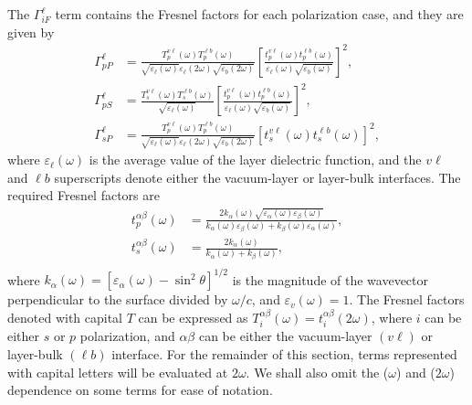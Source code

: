 \documentclass[prb,superscriptaddress,showpacs,twocolumn,letterpaper]{revtex4}
\begin{document}
The $\Gamma^{\ell}_{iF}$ term contains the Fresnel factors for each polarization
case, and they are given by
\begin{align*}
\Gamma^{\ell}_{pP} &=
\frac{T^{v\ell}_{p}(\omega)T^{\ell b}_{p}(\omega)}
     {\sqrt{\varepsilon_{\ell}(\omega)}\varepsilon_{\ell}({2\omega})
     \sqrt{\varepsilon_{b}(2\omega)}}
\left[\frac{t^{v\ell}_{p}(\omega)t^{\ell b}_{p}(\omega)}
{\varepsilon_{\ell}(\omega)\sqrt{\varepsilon_{b}(\omega)}}\right]^{2},\\
\Gamma^{\ell}_{pS} &=
\frac{T^{v\ell}_{s}(\omega)T^{\ell b}_{s}(\omega)}
     {\sqrt{\varepsilon_{\ell}(\omega)}}
\left[\frac{t^{v\ell}_{p}(\omega)t^{\ell b}_{p}(\omega)}
      {\varepsilon_{\ell}(\omega)\sqrt{\varepsilon_{b}(\omega)}}\right]^{2},\\
\Gamma^{\ell}_{sP} &=
\frac{T_{p}^{v\ell}(\omega)T^{\ell b}_{p}(\omega)}
    {\sqrt{\varepsilon_{\ell}(\omega)}\varepsilon_{\ell}(2\omega)
    \sqrt{\varepsilon_{b}(2\omega)}}
\left[t_s^{v\ell}(\omega)t^{\ell b}_s(\omega)\right]^2,
\end{align*}
where $\varepsilon_{\ell}(\omega)$ is the average value of the layer dielectric
function, and the $v\ell$ and $\ell b$ superscripts denote either the
vacuum-layer or layer-bulk interfaces. The required Fresnel factors
are\cite{mizrahiJOSA88}
\begin{align*}
t_{p}^{\alpha\beta}(\omega) &=
\frac{2k_{\alpha}(\omega)
\sqrt{\varepsilon_{\alpha}(\omega)\varepsilon_{\beta}(\omega)}}
{k_{\alpha}(\omega)\varepsilon_{\beta}(\omega)+
k_{\beta}(\omega)\varepsilon_{\alpha}(\omega)},\\
t_s^{\alpha\beta}(\omega) &=
\frac{2k_{\alpha}(\omega)}{k_{\alpha}(\omega)+k_{\beta}(\omega)},\\
\end{align*}
where $k_{\alpha}(\omega) = [\varepsilon_{\alpha}(\omega)-\sin^2\theta]^{1/2}$
is the magnitude of the wavevector perpendicular to the surface divided by
$\omega/c$, and $\varepsilon_{v}(\omega) = 1$. The Fresnel factors denoted with
capital $T$ can be expressed as $T^{\alpha\beta}_{i}(\omega) =
t^{\alpha\beta}_{i}(2\omega)$, where $i$ can be either $s$ or $p$ polarization,
and $\alpha\beta$ can be either the vacuum-layer $(v\ell)$ or layer-bulk $(\ell
b)$ interface. For the remainder of this section, terms represented with capital
letters will be evaluated at $2\omega$. We shall also omit the ($\omega$) and
($2\omega$) dependence on some terms for ease of notation.
\end{document}
